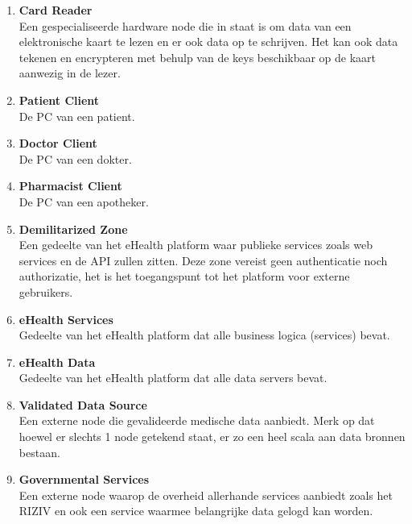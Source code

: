 \documentclass[a4paper,10pt]{paper}
\begin{document}
\begin{enumerate}
\item \textbf{Card Reader}\\
Een gespecialiseerde hardware node die in staat is om data van een elektronische kaart te lezen en er ook data op te schrijven. Het kan ook data tekenen en encrypteren met behulp van de keys beschikbaar op de kaart aanwezig in de lezer.
\item \textbf{Patient Client}\\
De PC van een patient.
\item \textbf{Doctor Client}\\
De PC van een dokter.
\item \textbf{Pharmacist Client}\\
De PC van een apotheker.
\item \textbf{Demilitarized Zone}\\
Een gedeelte van het eHealth platform waar publieke services zoals web services en de API zullen zitten. Deze zone vereist geen authenticatie noch authorizatie, het is het toegangspunt tot het platform voor externe gebruikers.
\item \textbf{eHealth Services}\\
Gedeelte van het eHealth platform dat alle business logica (services) bevat.
\item \textbf{eHealth Data}\\
Gedeelte van het eHealth platform dat alle data servers bevat.
\item \textbf{Validated Data Source}\\
Een externe node die gevalideerde medische data aanbiedt. Merk op dat hoewel er slechts 1 node getekend staat, er zo een heel scala aan data bronnen bestaan.
\item \textbf{Governmental Services}\\
Een externe node waarop de overheid allerhande services aanbiedt zoals het RIZIV en ook een service waarmee belangrijke data gelogd kan worden.
\end{enumerate}
\end{document}
